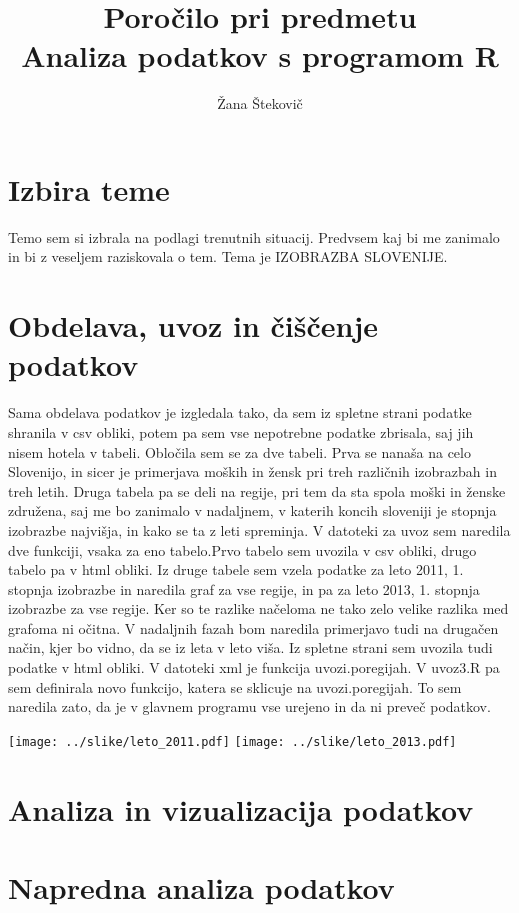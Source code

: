 \documentclass[11pt,a4paper]{article}
\begin{document}
\title{Poročilo pri predmetu \\
Analiza podatkov s programom R}
\author{Žana Štekovič}
\maketitle

\section{Izbira teme}
Temo sem si izbrala na podlagi trenutnih situacij. Predvsem kaj bi me zanimalo in bi z veseljem raziskovala o tem.
Tema je IZOBRAZBA SLOVENIJE.

\section{Obdelava, uvoz in čiščenje podatkov}
Sama obdelava podatkov je izgledala tako, da sem iz spletne strani podatke shranila v csv obliki, potem pa sem vse nepotrebne podatke zbrisala, saj jih nisem hotela v tabeli.
Obločila sem se za dve tabeli. Prva se nanaša na celo Slovenijo, in sicer je primerjava moških in žensk pri treh različnih izobrazbah in treh letih.
Druga tabela pa se deli na regije, pri tem da sta spola moški in ženske združena, saj me bo zanimalo v nadaljnem, v katerih koncih sloveniji je stopnja izobrazbe najvišja, in kako se ta z leti spreminja.
V datoteki za uvoz sem naredila dve funkciji, vsaka za eno tabelo.Prvo tabelo sem uvozila v csv obliki, drugo tabelo pa v html obliki. Iz druge tabele sem vzela podatke za leto 2011, 1. stopnja izobrazbe in naredila graf za vse regije, in pa za leto 2013, 1. stopnja izobrazbe za vse regije. Ker so te razlike načeloma ne tako zelo velike razlika med grafoma ni očitna.
V nadaljnih fazah bom naredila primerjavo tudi na drugačen način, kjer bo vidno, da se iz leta v leto viša.  Iz spletne strani sem uvozila tudi podatke v html obliki. V datoteki xml je funkcija uvozi.poregijah. V uvoz3.R  pa sem definirala novo funkcijo, katera se sklicuje na uvozi.poregijah. To sem naredila zato, da je v glavnem programu vse urejeno in da ni preveč podatkov.

\texttt{[image: ../slike/leto\_2011.pdf]}
\texttt{[image: ../slike/leto\_2013.pdf]}

\section{Analiza in vizualizacija podatkov}


\section{Napredna analiza podatkov}

\end{document}
